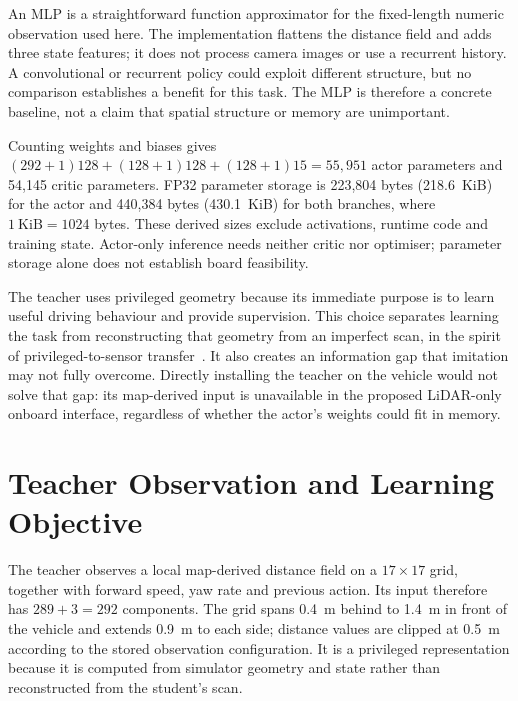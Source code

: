 An MLP is a straightforward function approximator for the fixed-length numeric
observation used here. The implementation flattens the distance field and adds
three state features; it does not process camera images or use a recurrent
history. A convolutional or recurrent policy could exploit different structure,
but no comparison establishes a benefit for this task. The MLP is therefore a
concrete baseline, not a claim that spatial structure or memory are unimportant.

Counting weights and biases gives
$(292+1)128+(128+1)128+(128+1)15=55{,}951$ actor parameters and
54,145 critic parameters. FP32 parameter storage is 223,804 bytes (218.6~KiB)
for the actor and 440,384 bytes (430.1~KiB) for both branches, where
$1~\mathrm{KiB}=1024$ bytes. These derived sizes exclude activations, runtime
code and training state. Actor-only inference needs neither critic nor optimiser;
parameter storage alone does not establish board feasibility.

The teacher uses privileged geometry because its immediate purpose is to learn
useful driving behaviour and provide supervision. This choice separates
learning the task from reconstructing that geometry from an imperfect scan,
in the spirit of privileged-to-sensor transfer~\cite{chen2019cheating}. It also
creates an information gap that imitation may not fully overcome. Directly
installing the teacher on the vehicle would not solve that gap: its map-derived
input is unavailable in the proposed LiDAR-only onboard interface, regardless
of whether the actor's weights could fit in memory.

\section{Teacher Observation and Learning Objective}
The teacher observes a local map-derived distance field on a $17\times17$
grid, together with forward speed, yaw rate and previous action. Its input
therefore has $289+3=292$ components. The grid spans 0.4~m behind to 1.4~m
in front of the vehicle and extends 0.9~m to each side; distance values are
clipped at 0.5~m according to the stored observation configuration. It is a
privileged representation because it is computed from simulator geometry and
state rather than reconstructed from the student's scan.

